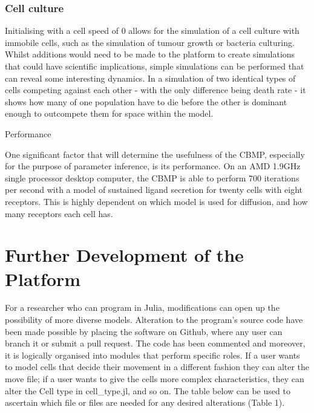 \documentclass[11.5pt]{article}
\begin{document}
\subsubsection{Cell culture }
Initialising with a cell speed of 0 allows for the simulation of a cell 
culture with immobile cells, such as the simulation of tumour growth or 
bacteria culturing. Whilst additions would need to be made to the 
platform to create simulations that could have scientific implications, 
simple simulations can be performed that can reveal some interesting 
dynamics. In a simulation of two identical types of cells competing 
against each other - with the only difference being death rate - it 
shows how many of one population have to die before the other is 
dominant enough to outcompete them for space within the model.





Performance

One significant factor that will determine the usefulness of the CBMP, 
especially for the purpose of parameter inference, is its performance. 
On an AMD 1.9GHz single processor desktop computer, the CBMP is able to 
perform 700 iterations per second with a model of sustained ligand 
secretion for twenty cells with eight receptors. This is highly 
dependent on which model is used for diffusion, and how many receptors 
each cell has.

\section{Further Development of the 
Platform}
For a researcher who can program in Julia, modifications can open up the 
possibility of more diverse models. Alteration to the program's source 
code have been made possible by placing the software on Github, where 
any user can branch it or submit a pull request. The code has been 
commented and moreover, it is logically organised into modules that 
perform specific roles. If a user wants to model cells that decide their 
movement in a different fashion they can alter the move file; if a user 
wants to give the cells more complex characteristics, they can alter the 
Cell type in cell\_type.jl, and so on. The table below can be used to 
ascertain which file or files are needed for any desired alterations 
(Table 1).
\end{document}
